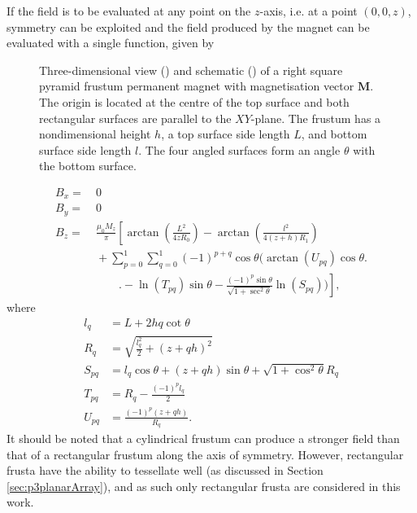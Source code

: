 If the field is to be evaluated at any point on the \(z\)-axis, i.e. at a point \(\left(0,0,z\right)\), symmetry can be exploited and the field produced by the magnet can be evaluated with a single function, given by
\begin{figure}
	\centering
	
	\caption{Three-dimensional view () and schematic () of a right square pyramid frustum permanent magnet with magnetisation vector \(\mathbf{M}\). The origin is located at the centre of the top surface and both rectangular surfaces are parallel to the \(XY\)-plane. The frustum has a nondimensional height \(h\), a top surface side length \(L\), and bottom surface side length \(l\). The four angled surfaces form an angle \(\theta\) with the bottom surface.}
	\label{fig:p3squareFrustum}
\end{figure}
\begin{align}
B_x = &\ 0 \nonumber \\
B_y = &\ 0 \nonumber \\
B_z = &\ \frac{\mu_0 M_z}{\pi} \left[ \arctan\left(\frac{L^2}{4zR_{0}}\right) - \arctan\left(\frac{l^2}{4\left(z+h\right)R_{1}}\right)\right. \nonumber \\
&\ +\left. \sum_{p=0}^1 \sum_{q=0}^1 \left(-1\right)^{p+q} \cos\theta \Big(\arctan\left(U_{pq}\right) \cos\theta    \Big.\right. \nonumber \\
&\qquad \ \left.\Big.  - \ln\left(T_{pq}\right)\sin\theta - \frac{\left(-1\right)^p\sin\theta}{\sqrt{1+\sec^2\theta}} \ln\left({S_{pq}}\right) \Big) \right] \text{,}
\end{align}
where
\begin{align*}
l_q &= L + 2hq\cot\theta \\
R_{q} &= \sqrt{\frac{l_q^2}{2}+\left(z+qh\right)^2} \\
S_{pq} &= l_q\cos\theta + \left(z+qh\right)\sin\theta + \sqrt{1+\cos^2\theta}R_{q} \\
T_{pq} &= R_{q} - \frac{\left(-1\right)^p l_q}{2} \\
U_{pq} &= \frac{\left(-1\right)^p\left(z+qh\right)}{R_{q}} \text{.}
\end{align*}
It should be noted that a cylindrical frustum can produce a stronger field than that of a rectangular frustum along the axis of symmetry. However, rectangular frusta have the ability to tessellate well (as discussed in Section \ref{sec:p3planarArray}), and as such only rectangular frusta are considered in this work.

